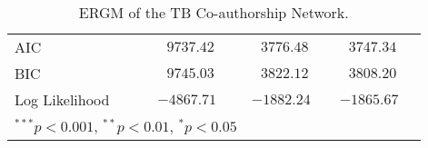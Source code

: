 \begin{table}
\begin{center}
\begin{tabular}{@{}lcclclcl@{}}
\midrule
AIC           &  & $\hspace{6pt}9737.42$  &  & $\hspace{6pt}3776.48$  &  & $\hspace{6pt}3747.34$ \\
BIC           &  & $\hspace{6pt}9745.03$  &  & $\hspace{6pt}3822.12$  &  & $\hspace{6pt}3808.20$ \\
Log Likelihood   &  & $-4867.71$        &  & $-1882.24$         &    & $-1865.67$ \\
\bottomrule
\multicolumn{4}{l}{\scriptsize{$^{***}p<0.001$, $^{**}p<0.01$, $^*p<0.05$}}
\end{tabular}
\caption{ERGM of the TB Co-authorship Network.}
\label{tab:tb_ergm}
\end{center}
\end{table}
